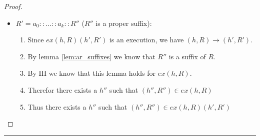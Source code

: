 \documentclass[a4paper,11pt]{article}
\newcommand{\ex}{\mathit{ex}}
\newcommand{\sep}{\hspace{-1.5707965cm}\rule{\paperwidth}{1pt}}
\begin{document}
{\begin{proof}
\begin{itemize}
\begin{enumerate}
\begin{itemize}
      \item $R' = a_0::...::a_k::R''$ ($R''$ is a proper suffix):
        \begin{enumerate}
        \item Since $\ex(h,R)(h',R')$ is an execution, we have $(h, R) \rightarrow (h', R')$.
        \item By lemma \ref{lem:ar_suffixes} we know that $R''$ is a suffix of $R$.
        \item By IH we know that this lemma holds for $\ex(h, R)$.
        \item Therefor there exists a $h''$ such that $(h'', R'') \in \ex (h, R)$
        \item Thus there exists a $h''$ such that $(h'', R'') \in \ex (h, R) (h', R')$
        \end{enumerate}
    \end{itemize}


  \end{enumerate}
\end{itemize}
\end{proof}
}


\sep
\end{document}
